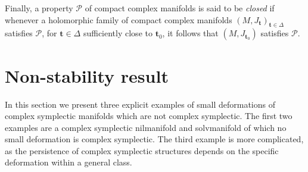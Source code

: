 \documentclass[a4paper]{amsart}
\theoremstyle{definition}
\theoremstyle{remark}
\numberwithin{equation}{section}
\begin{document}
Finally, a property $\mathcal P$ of compact complex manifolds is said to be \emph{closed} if whenever a holomorphic family of compact complex manifolds $(M,J_{\mathbf t})_{\mathbf t\in\Delta}$ satisfies $\mathcal P$, for $\mathbf t\in\Delta$ sufficiently close to $\mathbf t_0$, it follows that $(M,J_{\mathbf t_0})$ satisfies $\mathcal P$.




%
%

\section{Non-stability result}\label{non-stability}

In this section we present three explicit examples of small deformations of complex symplectic manifolds which are not complex symplectic. The first two examples are a complex symplectic nilmanifold and solvmanifold of which no small deformation is complex symplectic. The third example is more complicated, as the persistence of complex symplectic structures depends on the specific deformation within a general class.
\end{document}
